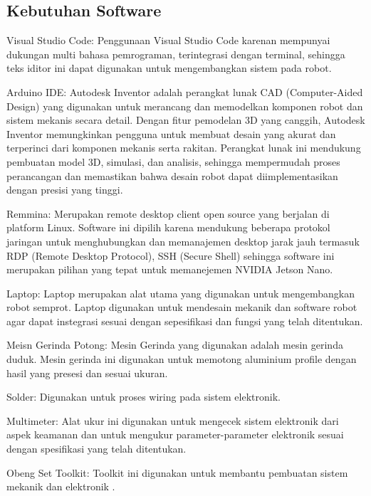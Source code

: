 \subsection{Kebutuhan Software}
\begin{packed_item}
	\item Visual Studio Code: Penggunaan  Visual Studio Code karenan mempunyai dukungan multi bahasa pemrograman, terintegrasi dengan terminal, sehingga teks iditor ini dapat digunakan untuk mengembangkan sistem pada robot. 
	\item Arduino IDE: Autodesk Inventor adalah perangkat lunak CAD (Computer-Aided Design) yang digunakan untuk merancang dan memodelkan komponen robot dan sistem mekanis secara detail. Dengan fitur pemodelan 3D yang canggih, Autodesk Inventor memungkinkan pengguna untuk membuat desain yang akurat dan terperinci dari komponen mekanis serta rakitan. Perangkat lunak ini mendukung pembuatan model 3D, simulasi, dan analisis, sehingga mempermudah proses perancangan dan memastikan bahwa desain robot dapat diimplementasikan dengan presisi yang tinggi.
	\item Remmina: Merupakan remote desktop client open source yang berjalan di platform Linux. Software ini dipilih karena mendukung beberapa protokol jaringan untuk menghubungkan dan memanajemen desktop jarak jauh termasuk RDP (Remote Desktop Protocol), SSH (Secure Shell) sehingga software ini  merupakan pilihan yang tepat untuk memanejemen NVIDIA Jetson Nano.
\end{packed_item}

\begin{packed_item}
	\item Laptop: Laptop merupakan alat utama yang digunakan untuk mengembangkan robot semprot. Laptop digunakan untuk mendesain mekanik dan software robot agar dapat instegrasi sesuai dengan sepesifikasi dan fungsi yang telah ditentukan.
	\item Meisn Gerinda Potong: Mesin Gerinda yang digunakan adalah mesin gerinda duduk. Mesin gerinda ini digunakan untuk memotong aluminium profile dengan hasil yang presesi dan sesuai ukuran.
	\item Solder: Digunakan untuk proses wiring pada sistem elektronik.
	\item Multimeter: Alat ukur ini digunakan untuk mengecek sistem elektronik dari aspek keamanan dan untuk mengukur parameter-parameter elektronik sesuai dengan spesifikasi yang telah ditentukan.
	\item Obeng Set Toolkit: Toolkit ini digunakan untuk membantu pembuatan sistem mekanik dan elektronik .
\end{packed_item}

